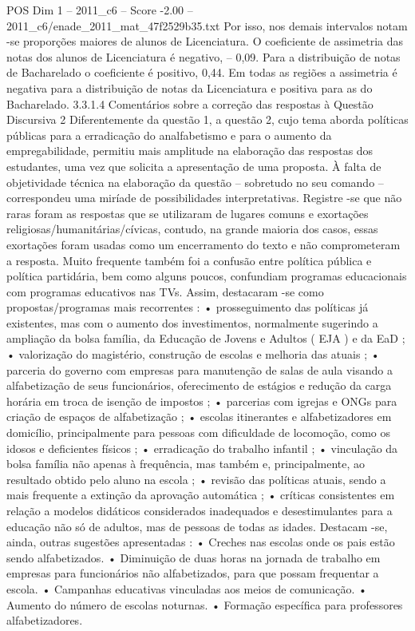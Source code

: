 \begin{textsample}{POS Dim 1 – 2011\_c6 – Score -2.00 – 2011\_c6/enade\_2011\_mat\_47f2529b35.txt}
Por isso, nos demais intervalos notam -se proporções maiores de alunos de Licenciatura.
O coeficiente de assimetria das notas dos alunos de Licenciatura é negativo, – 0,09.
Para a distribuição de notas de Bacharelado o coeficiente é positivo, 0,44.
Em todas as regiões a assimetria é negativa para a distribuição de notas da Licenciatura e positiva para as do Bacharelado. 3.3.1.4 Comentários sobre a correção das respostas à Questão Discursiva 2 Diferentemente da questão 1, a questão 2, cujo tema aborda políticas públicas para a erradicação do analfabetismo e para o aumento da empregabilidade, permitiu mais amplitude na elaboração das respostas dos estudantes, uma vez que solicita a apresentação de uma proposta.
À falta de objetividade técnica na elaboração da questão – sobretudo no seu comando – correspondeu uma miríade de possibilidades interpretativas.
Registre -se que não raras foram as respostas que se utilizaram de lugares comuns e exortações religiosas/humanitárias/cívicas, contudo, na grande maioria dos casos, essas exortações foram usadas como um encerramento do texto e não comprometeram a resposta.
Muito frequente também foi a confusão entre política pública e política partidária, bem como alguns poucos, confundiam programas educacionais com programas educativos nas TVs.
Assim, destacaram -se como propostas/programas mais recorrentes : • prosseguimento das políticas já existentes, mas com o aumento dos investimentos, normalmente sugerindo a ampliação da bolsa família, da Educação de Jovens e Adultos ( EJA ) e da EaD ; • valorização do magistério, construção de escolas e melhoria das atuais ; • parceria do governo com empresas para manutenção de salas de aula visando a alfabetização de seus funcionários, oferecimento de estágios e redução da carga horária em troca de isenção de impostos ; • parcerias com igrejas e ONGs para criação de espaços de alfabetização ; • escolas itinerantes e alfabetizadores em domicílio, principalmente para pessoas com dificuldade de locomoção, como os idosos e deficientes físicos ; • erradicação do trabalho infantil ; • vinculação da bolsa família não apenas à frequência, mas também e, principalmente, ao resultado obtido pelo aluno na escola ; • revisão das políticas atuais, sendo a mais frequente a extinção da aprovação automática ; • críticas consistentes em relação a modelos didáticos considerados inadequados e desestimulantes para a educação não só de adultos, mas de pessoas de todas as idades.
Destacam -se, ainda, outras sugestões apresentadas : • Creches nas escolas onde os pais estão sendo alfabetizados. • Diminuição de duas horas na jornada de trabalho em empresas para funcionários não alfabetizados, para que possam frequentar a escola. • Campanhas educativas vinculadas aos meios de comunicação. • Aumento do número de escolas noturnas. • Formação específica para professores alfabetizadores.

\end{textsample}
